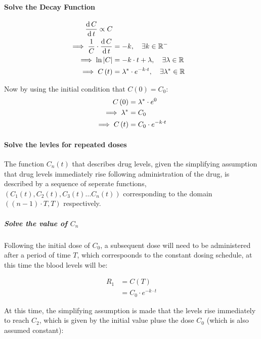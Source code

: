 \paragraph{Solve the Decay Function}

\begin{align}
\frac{\operatorname{d}C }{\operatorname{d} t} \propto C\notag \\ 
\implies  \frac{1}{C}\cdot  \frac{\operatorname{d}C }{\operatorname{d} t}&= -k, \quad \exists k\in \mathbb{R}^{- } \notag \\ 
\implies  \ln{ \left| C \right| }&= -k\cdot  t+ \lambda, \quad \exists \lambda \in \mathbb{R}\notag \\ 
\implies  C\left( t \right)&= \lambda^*\cdot  e^{-k\cdot  t}, \quad \exists \lambda^* \in \mathbb{R}
\end{align}

Now by using the initial condition that $C\left( 0 \right)= C_0$:
\begin{align}
  C\left( 0 \right)&= \lambda^*\cdot  e^{0} \notag \\ 
   \implies  \lambda^* &= C_0 \notag \\ 
    \implies  C\left( t \right)&= C_0\cdot  e^{-k\cdot  t} 
\end{align}




\paragraph{Solve the levles for repeated doses}
The function $C_n\left( t \right)$ that describes drug levels, given the simplifying assumption that drug levels immediately rise following administration of the drug, is described by a sequence of seperate functions, $\left( C_1\left( t \right), C_2\left( t \right), C_3\left( t \right) \dots C_n\left( t \right) \right)$ corresponding to the domain $\left( \left( n- 1 \right)\cdot  T , T \right)$ respectively.
\subparagraph{Solve the value of $C_n$}
Following the initial dose of $C_0$, a subsequent dose will need to be administered after a period of time $T$, which correspoonds to the constant dosing schedule, at this time the blood levels will be:

\begin{align*}
  R_1&= C\left( T \right) \\
  &= C_0\cdot  e^{-k\cdot  t}
\end{align*}

At this time, the simplifying assumption is made that the levels rise immediately to reach $C_2$, which is given by the initial value pluse the dose $C_0$ (which is also assumed constant):

